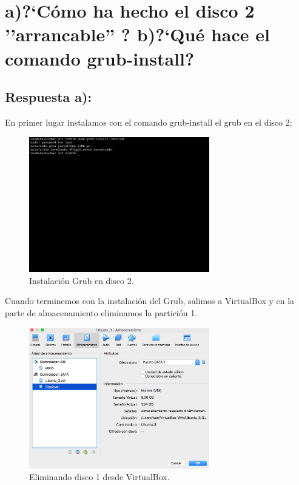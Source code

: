 \newpage
\section{a)?`Cómo ha hecho el disco 2 ''arrancable'' ? b)?`Qué hace el comando grub-install?}
\subsection{Respuesta a):}
En primer lugar instalamos con el comando grub-install el grub en el disco 2:
\begin{figure}[H]
	\begin{center}
		\includegraphics[width=0.7\textwidth]{Imagenes/01_Instalando_Grub}
		\caption{Instalación Grub en disco 2.} \label{fig:figura1}
	\end{center}
\end{figure}	
Cuando terminemos con la instalación del Grub, salimos a VirtualBox y en la parte de almacenamiento eliminamos la partición 1.
\begin{figure}[H]
	\begin{center}	
		\includegraphics[width=0.7\textwidth]{Imagenes/02_Eliminando_particion_1}
		\caption{Eliminando disco 1 desde VirtualBox.} \label{fig:figura2}
	\end{center}
\end{figure}
